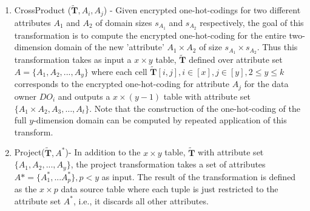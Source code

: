 \begin{enumerate}

	\item CrossProduct ($\tilde{\mathbf{T}}, A_i, A_j$) - Given encrypted one-hot-codings for two different attributes $A_1$ and $A_2$ of domain sizes $s_{A_1}$ and $s_{A_2}$ respectively, the goal of this transformation is to compute the encrypted one-hot-coding for the entire two-dimension domain of the new 'attribute' $A_1\times A_2$ of size $s_{A_1}\times s_{A_2}$. Thus this transformation takes as input a $x \times y $ table, $\tilde{\mathbf{T}}$ defined over attribute set $A=\{A_1,A_2,...,A_y\}$ where each cell $\tilde{\mathbf{T}}[i,j] , i \in [x], j \in [y], 2 \leq y \leq k$ corresponds to the encrypted one-hot-coding for attribute $A_j$ for the data owner $DO_i$ and outputs a $x \times (y-1)$ table with attribute set $\{A_1\times A_2,A_3,\ldots,A_{t}\}$.  Note that the construction of the one-hot-coding of the full $y$-dimension domain can be computed by repeated application of this transform. 	
    
	
	\item Project($\tilde{\mathbf{T}},A^*$)- In addition to the $ x \times y$ table, $\tilde{\mathbf{T}}$ with attribute set $\{A_1, A_2, ..., A_y\}$, the project transformation takes a set of attributes $A*=\{A^*_1,...A^*_p\}, p < y$ as input. The result of the transformation is defined as the $x \times p$ data source table where each tuple is just restricted to the attribute set $A^*$, i.e., it discards all other attributes. 
   

\end{enumerate}
